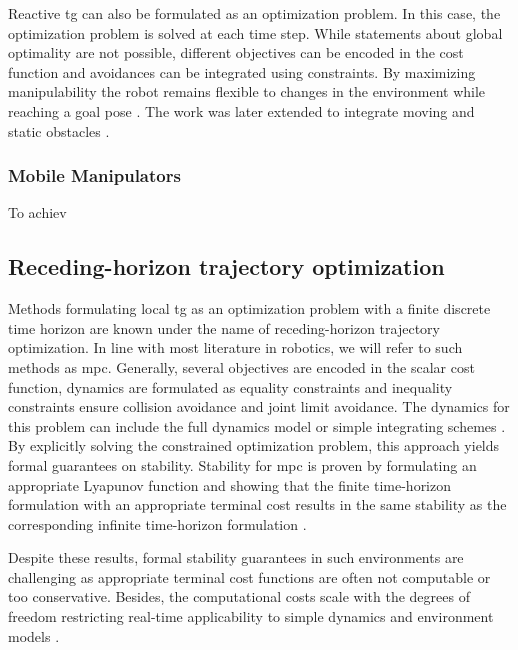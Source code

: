 Reactive \ac{tg} can also be formulated as an optimization
problem. In this case, the optimization problem is solved
at each time step. While statements about global optimality
are not possible, different objectives can be encoded in the
cost function and avoidances can be integrated using
constraints. By maximizing manipulability the robot remains
flexible to changes in the environment while reaching a goal
pose \cite{haviland2020purely}. The work was later extended
to integrate moving and static obstacles
\cite{haviland2021neo}.

\subsubsection{Mobile Manipulators}
\label{subsub:mobile_manipulators}

To achiev 


\subsection{Receding-horizon trajectory optimization}%
\label{sub:receding_horizon_trajectory_optimization}

Methods formulating local \ac{tg} as an optimization problem with a finite
discrete time horizon are known under the name of receding-horizon trajectory
optimization. In line with most literature in robotics, we will refer to such
methods as \ac{mpc}.
Generally, several objectives are encoded in the scalar cost function, dynamics
are formulated as equality constraints and inequality constraints ensure
collision avoidance and joint limit avoidance. The dynamics for this problem can
include the full dynamics model or simple integrating
schemes \cite{hewing2020learning}.
By explicitly solving the constrained optimization problem, this approach yields
formal guarantees on stability. Stability for \ac{mpc} is proven by formulating
an appropriate Lyapunov function and showing that the finite time-horizon
formulation with an appropriate terminal cost results in the same stability as
the corresponding infinite time-horizon formulation
\cite{l1,l4,keerthi1988optimal}. 

Despite these results, formal stability
guarantees in such environments are challenging as appropriate terminal cost
functions are often not computable or too conservative. Besides, the
computational costs scale with the degrees of freedom restricting real-time
applicability to simple dynamics and environment models \cite{Spahn2021}.

